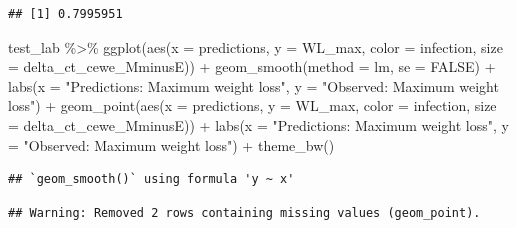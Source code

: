 \documentclass[
]{article}
\newenvironment{Shaded}{\begin{snugshade}}{\end{snugshade}}
\newcommand{\AttributeTok}[1]{\textcolor[rgb]{0.77,0.63,0.00}{#1}}
\newcommand{\ConstantTok}[1]{\textcolor[rgb]{0.00,0.00,0.00}{#1}}
\newcommand{\FunctionTok}[1]{\textcolor[rgb]{0.00,0.00,0.00}{#1}}
\newcommand{\NormalTok}[1]{#1}
\newcommand{\SpecialCharTok}[1]{\textcolor[rgb]{0.00,0.00,0.00}{#1}}
\newcommand{\StringTok}[1]{\textcolor[rgb]{0.31,0.60,0.02}{#1}}
\begin{document}
\begin{Shaded}
\end{Shaded}

\begin{verbatim}
## [1] 0.7995951
\end{verbatim}

\begin{Shaded}
\begin{Highlighting}[]
\NormalTok{test\_lab   }\SpecialCharTok{\%\textgreater{}\%}
  \FunctionTok{ggplot}\NormalTok{(}\FunctionTok{aes}\NormalTok{(}\AttributeTok{x =}\NormalTok{ predictions, }\AttributeTok{y =}\NormalTok{ WL\_max, }\AttributeTok{color =}\NormalTok{ infection, }
                 \AttributeTok{size =}\NormalTok{ delta\_ct\_cewe\_MminusE)) }\SpecialCharTok{+}
  \FunctionTok{geom\_smooth}\NormalTok{(}\AttributeTok{method =}\NormalTok{ lm, }\AttributeTok{se =} \ConstantTok{FALSE}\NormalTok{) }\SpecialCharTok{+}
  \FunctionTok{labs}\NormalTok{(}\AttributeTok{x =} \StringTok{"Predictions: Maximum weight loss"}\NormalTok{, }
       \AttributeTok{y =} \StringTok{"Observed: Maximum weight loss"}\NormalTok{) }\SpecialCharTok{+}
  \FunctionTok{geom\_point}\NormalTok{(}\FunctionTok{aes}\NormalTok{(}\AttributeTok{x =}\NormalTok{ predictions, }\AttributeTok{y =}\NormalTok{ WL\_max, }
                 \AttributeTok{color =}\NormalTok{ infection, }\AttributeTok{size =}\NormalTok{ delta\_ct\_cewe\_MminusE)) }\SpecialCharTok{+}
  \FunctionTok{labs}\NormalTok{(}\AttributeTok{x =} \StringTok{"Predictions: Maximum weight loss"}\NormalTok{, }
       \AttributeTok{y =} \StringTok{"Observed: Maximum weight loss"}\NormalTok{) }\SpecialCharTok{+}
    \FunctionTok{theme\_bw}\NormalTok{()}
\end{Highlighting}
\end{Shaded}

\begin{verbatim}
## `geom_smooth()` using formula 'y ~ x'
\end{verbatim}

\begin{verbatim}
## Warning: Removed 2 rows containing missing values (geom_point).
\end{verbatim}
\end{document}
